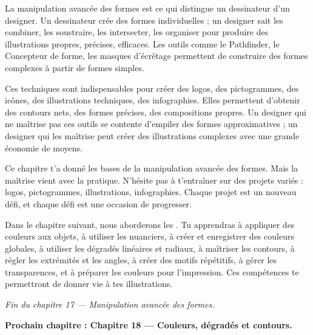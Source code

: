 La manipulation avancée des formes est ce qui distingue un dessinateur d'un designer. Un dessinateur crée des formes individuelles ; un designer sait les combiner, les soustraire, les intersecter, les organiser pour produire des illustrations propres, précises, efficaces. Les outils comme le Pathfinder, le Concepteur de forme, les masques d'écrêtage permettent de construire des formes complexes à partir de formes simples.

Ces techniques sont indispensables pour créer des logos, des pictogrammes, des icônes, des illustrations techniques, des infographies. Elles permettent d'obtenir des contours nets, des formes précises, des compositions propres. Un designer qui ne maîtrise pas ces outils se contente d'empiler des formes approximatives ; un designer qui les maîtrise peut créer des illustrations complexes avec une grande économie de moyens.

Ce chapitre t'a donné les bases de la manipulation avancée des formes. Mais la maîtrise vient avec la pratique. N'hésite pas à t'entraîner sur des projets variés : logos, pictogrammes, illustrations, infographies. Chaque projet est un nouveau défi, et chaque défi est une occasion de progresser.

Dans le chapitre suivant, nous aborderons les . Tu apprendras à appliquer des couleurs aux objets, à utiliser les nuanciers, à créer et enregistrer des couleurs globales, à utiliser les dégradés linéaires et radiaux, à maîtriser les contours, à régler les extrémités et les angles, à créer des motifs répétitifs, à gérer les transparences, et à préparer les couleurs pour l'impression. Ces compétences te permettront de donner vie à tes illustrations.

\vspace{2em}

\begin{center}
\textit{Fin du chapitre 17 --- Manipulation avancée des formes.}

\vspace{1em}

\textbf{Prochain chapitre : Chapitre 18 --- Couleurs, dégradés et contours.}
\end{center}